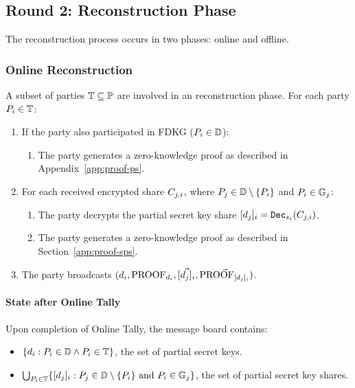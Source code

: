 \documentclass[lettersize,journal]{IEEEtran}
\theoremstyle{definition}
\begin{document}
\subsection{Round 2: Reconstruction Phase}

The reconstruction process occurs in two phases: online and offline.

\subsubsection{Online Reconstruction}
A subset of parties $\mathbb{T} \subseteq \mathbb{P}$ are involved in an reconstruction phase. For each party $P_{i} \in \mathbb{T}$:

\begin{enumerate}
    \item If the party also participated in FDKG ($P_{i} \in \mathbb{D}$):
    \begin{enumerate}
        \item The party generates a zero-knowledge proof  as described in Appendix~\ref{app:proof-ps}.
    \end{enumerate}
    
    \item For each received encrypted share $C_{j,i}$, where $P_{j} \in \mathbb{D} \setminus \{P_{i}\}$ and $P_{i} \in \mathbb{G}_{j}$:
        \begin{enumerate}
            \item The party decrypts the partial secret key share $[d_{j}]_{i}=\texttt{Dec}_{s_{i}}(C_{j,i})$.
            
            \item The party generates a zero-knowledge proof  as described in Section~\ref{app:proof-sps}.
        \end{enumerate}
        \item  The party broadcasts  $(d_{i},\textrm{PROOF}_{d_{i}}, \vec{[d_{j}]_{i}},\vec{\textrm{PROOF}_{[d_{j}]_{i}}})$.
\end{enumerate}
\paragraph*{State after Online Tally}
Upon completion of Online Tally, the message board contains:
\begin{itemize}
    \item $\{d_{i} :  P_{i} \in \mathbb{D} \land P_{i} \in \mathbb{T}\}$, the set of partial secret keys.
    \item $\bigcup_{P_{i} \in \mathbb{T}} \{[d_{j}]_{i} : P_{j} \in \mathbb{D} \setminus \{P_{i}\} \text{ and } P_{i} \in \mathbb{G}_{j}\}$, the set of partial secret key shares.
\end{itemize}
\end{document}

